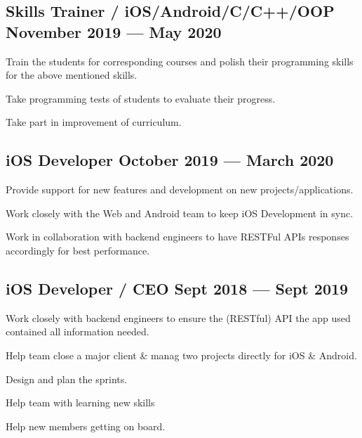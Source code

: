 \documentclass[letter,10pt]{article}
\begin{document}
\subsection{{Skills Trainer / iOS/Android/C/C++/OOP \hfill November 2019 --- May 2020}}
\begin{zitemize}
\item Train the students for corresponding courses and polish their programming skills for the above mentioned skills.
\item Take programming tests of students to evaluate their progress.
\item Take part in improvement of curriculum.
\end{zitemize}

\subsection{{iOS Developer \hfill October 2019 --- March 2020}}
\begin{zitemize}
\item Provide support for new features and development on new projects/applications.
\item Work closely with the Web and Android team to keep iOS Development in sync.
\item Work in collaboration with backend engineers to have RESTFul APIs responses accordingly for best performance.
\end{zitemize}

\subsection{{iOS Developer / CEO \hfill Sept 2018 --- Sept 2019}}
\begin{zitemize}
\item Work closely with backend engineers to ensure the (RESTful) API the app used contained all information needed.
\item Help team close a major client \& manag two projects directly for iOS \& Android.
\item Design and plan the sprints.
\item Help team with learning new skills
\item Help new members getting on board.
\end{zitemize}
\end{document}

